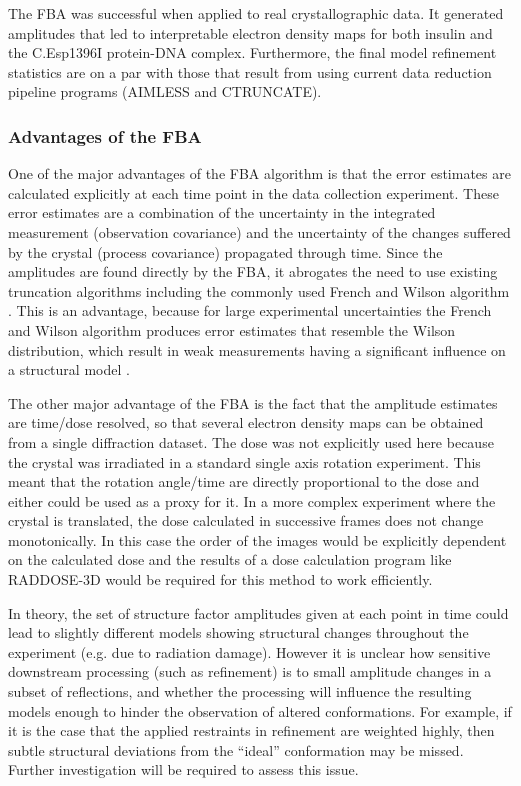 The FBA was successful when applied to real crystallographic data.
It generated amplitudes that led to interpretable electron density maps for both insulin and the C.Esp1396I protein-DNA complex.
Furthermore, the final model refinement statistics are on a par with those that result from using current data reduction pipeline programs (AIMLESS and CTRUNCATE).

\subsubsection{Advantages of the FBA}
\label{subs:Advantages of the FBA}
One of the major advantages of the FBA algorithm is that the error estimates are calculated explicitly at each time point in the data collection experiment.
These error estimates are a combination of the uncertainty in the integrated measurement (observation covariance) and the uncertainty of the changes suffered by the crystal (process covariance) propagated through time.
Since the amplitudes are found directly by the FBA, it abrogates the need to use existing truncation algorithms including the commonly used French and Wilson algorithm \cite{french1978treatment}.
This is an advantage, because for large experimental uncertainties the French and Wilson algorithm produces error estimates that resemble the Wilson distribution, which result in weak measurements having a significant influence on a structural model \cite{read2015log}.

The other major advantage of the FBA is the fact that the amplitude estimates are time/dose resolved, so that several electron density maps can be obtained from a single diffraction dataset.
The dose was not explicitly used here because the crystal was irradiated in a standard single axis rotation experiment.
This meant that the rotation angle/time are directly proportional to the dose and either could be used as a proxy for it.
In a more complex experiment where the crystal is translated, the dose calculated in successive frames does not change monotonically.
In this case the order of the images would be explicitly dependent on the calculated dose and the results of a dose calculation program like RADDOSE-3D would be required for this method to work efficiently.

In theory, the set of structure factor amplitudes given at each point in time could lead to slightly different models showing structural changes throughout the experiment (e.g. due to radiation damage).
However it is unclear how sensitive downstream processing (such as refinement) is to small amplitude changes in a subset of reflections, and whether the processing will influence the resulting models enough to hinder the observation of altered conformations.
For example, if it is the case that the applied restraints in refinement are weighted highly, then subtle structural deviations from the ``ideal'' conformation may be missed.
Further investigation will be required to assess this issue.

